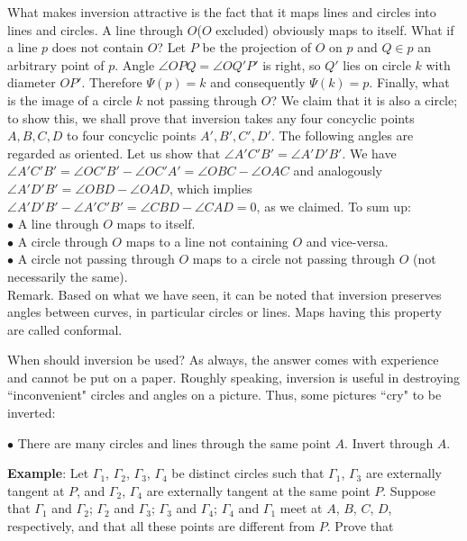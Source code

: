 \documentclass[11pt,a4paper]{article}
\begin{document}
What makes inversion attractive is the fact that it maps lines and circles into lines and circles. A line through $O$($O$ excluded) obviously maps to itself. What if a line $p$  does not contain $O$? Let $P$ be the projection of $O$ on $p$ and $Q\in p$ an arbitrary point of $p$. Angle $\angle OPQ=\angle OQ\prime P\prime$ is right, so $Q'$ lies on circle $k$ with diameter $OP'$. Therefore $\Psi(p)=k$ and consequently $\Psi(k)=p$. Finally, what is the image of a circle $k$  not passing through $O$? We claim that it is also a circle; to show this, we shall prove that inversion takes any four concyclic points $A,B,C,D$  to four concyclic points $A', B', C', D'$. The following angles are regarded as oriented. Let us show that $\angle A\prime C\prime B\prime =\angle A\prime D\prime B\prime$. We have $\angle A\prime C\prime B\prime =\angle OC\prime B\prime 
-\angle OC\prime A\prime =\angle OBC-\angle OAC$ and analogously $\angle
A\prime D\prime B\prime =\angle OBD-\angle OAD$, which implies  $\angle A\prime D\prime B\prime -\angle
A\prime C\prime B\prime =\angle CBD-\angle CAD=0$, as we claimed. To sum up:\\
$\bullet$ A line through $O$ maps to itself.\\
$\bullet$ A circle through $O$ maps to a line not containing $O$ and vice-versa.\\
$\bullet$ A circle not passing through $O$ maps to a circle not passing through $O$ (not necessarily the same). \\

Remark. Based on what we have seen, it can be noted that inversion preserves angles between curves, in particular circles or lines. Maps having this property are called conformal.

When should inversion be used? As always, the answer comes with experience and cannot be put on a paper. Roughly speaking, inversion is useful in destroying ``inconvenient" circles and angles on a picture. Thus, some pictures ``cry" to be inverted:

$\bullet$ There are many circles and lines through the same point $A$. Invert through $A$.

\textbf{Example}: Let $\Gamma_1$, $\Gamma_2$, $\Gamma_3$, $\Gamma_4$ be distinct circles such that $\Gamma_1$, $\Gamma_3$ are externally tangent at $P$, and $\Gamma_2$, $\Gamma_4$ are externally tangent at the same point $P$. Suppose that $\Gamma_1$ and $\Gamma_2$; $\Gamma_2$ and $\Gamma_3$; $\Gamma_3$ and $\Gamma_4$; $\Gamma_4$ and $\Gamma_1$ meet at $A$, $B$, $C$, $D$, respectively, and that all these points are different from $P$. Prove that
\end{document}
